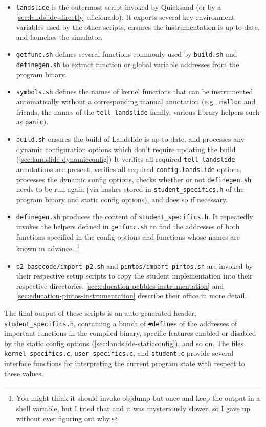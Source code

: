 \begin{itemize}
	\item {\tt landslide} is the outermost script invoked by Quicksand (or by a \cref{sec:landslide-directly} aficionado).
		It exports several key environment variables used by the other scripts,
		ensures the instrumentation is up-to-date,
		and launches the simulator.
	\item {\tt getfunc.sh} defines several functions commonly used by {\tt build.sh} and {\tt definegen.sh} to extract function or global variable addresses from the program binary.
	\item {\tt symbols.sh} defines the names of kernel functions that can be instrumented automatically without a corresponding manual annotation (e.g., {\tt malloc} and friends, the names of the {\tt tell\_landslide} family, various library helpers such as {\tt panic}).
	\item {\tt build.sh} ensures the build of Landslide is up-to-date,
		and processes any dynamic configuration options which don't require updating the build (\cref{sec:landslide-dynamicconfig})
		It verifies all required {\tt tell\_landslide} annotations are present,
		verifies all required {\tt config.\allowbreak{}landslide} options,
		processes the dynamic config options,
		checks whether or not {\tt definegen.sh} needs to be run again (via hashes stored in {\tt student\_specifics.h} of the program binary and static config options),
		and does so if necessary.
	\item {\tt definegen.sh} produces the
		content of {\tt student\_specifics.h}.
		It repeatedly invokes the helpers defined in {\tt getfunc.sh}
		to find the addresses of both functions specified in the config options
		and functions whose names are known in advance.%
		\footnote{You might think it should invoke objdump but once and keep the output in a shell variable,
		but I tried that and it was mysteriously slower, so I gave up without ever figuring out why.}
	\item {\tt p2-basecode/import-p2.sh} and {\tt pintos/import-pintos.sh}
		are invoked by their respective setup scripts
		to copy the student implementation into their respective directories.
		\cref{sec:education-pebbles-instrumentation} and \cref{sec:education-pintos-instrumentation}
		describe their office in more detail.
\end{itemize}

The final output of these scripts is an auto-generated header, {\tt student\_specifics.h},
containing a bunch of {\tt \#define}s of the addresses of important functions in the compiled binary,
specific features enabled or disabled by the static config options (\cref{sec:landslide-staticconfig}),
and so on.
The files {\tt kernel\_specifics.c}, {\tt user\_specifics.c}, and {\tt student.c} provide several interface functions
for interpreting the current program state with respect to these values.


